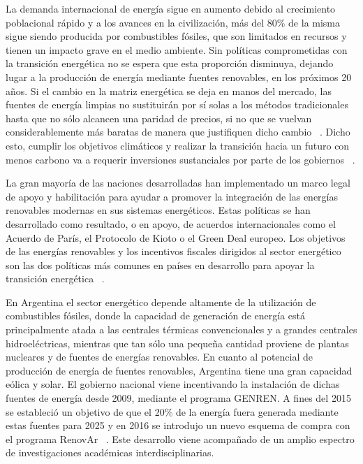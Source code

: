 La demanda internacional de energía sigue en aumento debido al crecimiento 
poblacional rápido y a los avances en la civilización, más del 80\% de la misma
sigue siendo producida por combustibles fósiles, que son limitados en recursos 
y tienen un impacto grave en el medio ambiente. Sin políticas comprometidas con 
la transición energética no se espera que esta proporción disminuya, dejando 
lugar a la producción de energía mediante fuentes renovables, en los próximos 20
años. Si el cambio en la matriz energética se deja en manos del mercado, las 
fuentes de energía limpias no sustituirán por sí solas a los métodos tradicionales
hasta que no sólo alcancen una paridad de precios, si no que se vuelvan 
considerablemente más baratas de manera que justifiquen dicho cambio
~\cite{davidson2019}. Dicho esto, cumplir los objetivos climáticos y realizar la 
transición hacia un futuro con menos carbono va a requerir inversiones 
sustanciales por parte de los gobiernos ~\cite{leonhardt2022}.

La gran mayoría de las naciones desarrolladas han implementado un marco legal de 
apoyo y habilitación para ayudar a promover la integración de las energías 
renovables modernas en sus sistemas energéticos. Estas políticas se han 
desarrollado como resultado, o en apoyo, de acuerdos internacionales como el 
Acuerdo de París, el Protocolo de Kioto o el Green Deal europeo. Los objetivos 
de las energías renovables y los incentivos fiscales dirigidos al sector 
energético son las dos políticas más comunes en países en desarrollo para apoyar 
la transición energética ~\cite{cantarero2020}.

En Argentina el sector energético depende altamente de la utilización de 
combustibles fósiles, donde la capacidad de generación de energía está 
principalmente atada a las centrales térmicas convencionales y a grandes 
centrales hidroeléctricas, mientras que tan sólo una pequeña cantidad proviene 
de plantas nucleares y de fuentes de energías renovables. En cuanto al potencial
de producción de energía de fuentes renovables, Argentina tiene una gran 
capacidad eólica y solar. El gobierno nacional viene incentivando la instalación 
de dichas fuentes de energía desde 2009, mediante el programa GENREN. A fines 
del 2015 se estableció un objetivo de que el 20\% de la energía fuera generada
mediante estas fuentes para 2025 y en 2016 se introdujo un nuevo esquema de 
compra con el programa RenovAr ~\cite{schaube2018}. Este desarrollo viene 
acompañado de un amplio espectro de investigaciones académicas 
interdisciplinarias.


